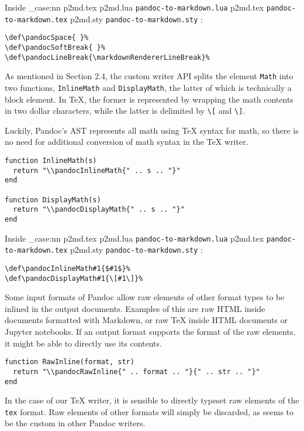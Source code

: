 \documentclass[
  digital,     %
  oneside,     %
  nosansbold,  %
  nocolorbold, %
  lof,         %
  nolot,       %
]{fithesis4}
\newcommand\file[1]
  {
    \str_case:nn
      { #1 }
      {
        { p2md.lua } { \texttt{pandoc\hyp{}to\hyp{}markdown.lua} }
        { p2md.tex } { \texttt{pandoc\hyp{}to\hyp{}markdown.tex} }
        { p2md.sty } { \texttt{pandoc\hyp{}to\hyp{}markdown.sty} }
      }
  }
\begin{document}
\noindent
Inside \file{p2md.tex}:

\noindent
\lstset{language=[plain]TeX}
\begin{lstlisting}
\def\pandocSpace{ }%
\def\pandocSoftBreak{ }%
\def\pandocLineBreak{\markdownRendererLineBreak}%
\end{lstlisting}

\noindent
As mentioned in Section 2.4, the custom writer API splits the element \texttt{Math} into two functions, \texttt{InlineMath} and \texttt{DisplayMath}, the latter of which is technically a block element. In \TeX{}, the former is represented by wrapping the math contents in two dollar characters, while the latter is delimited by \texttt{\textbackslash{}[} and \texttt{\textbackslash{}]}.

Luckily, Pandoc's AST represents all math using \TeX{} syntax for math, so there is no need for additional conversion of math syntax in the \TeX{} writer.

\noindent
\lstset{language=[5.3]Lua}
\begin{lstlisting}
function InlineMath(s)
  return "\\pandocInlineMath{" .. s .. "}"
end

function DisplayMath(s)
  return "\\pandocDisplayMath{" .. s .. "}"
end
\end{lstlisting}

\noindent
Inside \file{p2md.tex}:

\noindent
\lstset{language=[plain]TeX}
\begin{lstlisting}
\def\pandocInlineMath#1{$#1$}%
\def\pandocDisplayMath#1{\[#1\]}%
\end{lstlisting}

\noindent
Some input formats of Pandoc allow raw elements of other format types to be inlined in the output documents. Examples of this are raw HTML inside documents formatted with Markdown, or raw \TeX{} inside HTML documents or Jupyter notebooks. If an output format supports the format of the raw elements, it might be able to directly use its contents.

\noindent
\lstset{language=[5.3]Lua}
\begin{lstlisting}
function RawInline(format, str)
  return "\\pandocRawInline{" .. format .. "}{" .. str .. "}"
end
\end{lstlisting}

\noindent
In the case of our \TeX{} writer, it is sensible to directly typeset raw elements of the \texttt{tex} format. Raw elements of other formats will simply be discarded, as seems to be the custom in other Pandoc writers.
\end{document}

